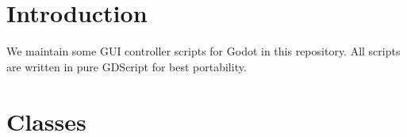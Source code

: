 \documentclass[11pt,a4paper]{report}
\begin{document}

\sffamily
\tableofcontents


\chapter{Introduction}
We maintain some GUI controller scripts for Godot in this repository.
All scripts are written in pure GDScript for best portability.







\chapter{Classes}


\end{document}
